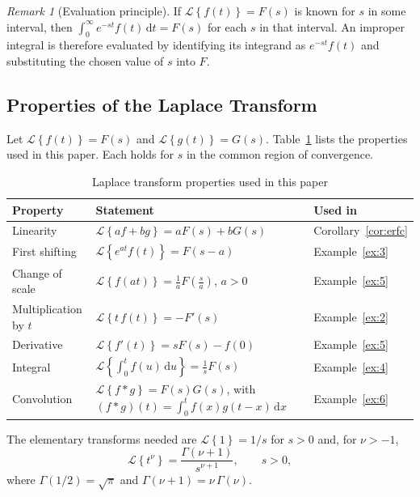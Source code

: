 \documentclass[12pt,a4paper]{article}
\theoremstyle{definition}
\theoremstyle{plain}
\theoremstyle{remark}
\newtheorem{remark}{Remark}[section]
\newcommand{\Lap}[1]{\mathcal{L}\!\left\{#1\right\}}
\newcommand{\dd}{\,\mathrm{d}}
\begin{document}
	\begin{remark}[Evaluation principle]\label{rem:principle}
		If $\Lap{f(t)}=F(s)$ is known for $s$ in some interval, then $\int_0^\infty e^{-st}f(t)\dd t=F(s)$ for each $s$ in that interval. An improper integral is therefore evaluated by identifying its integrand as $e^{-st}f(t)$ and substituting the chosen value of $s$ into $F$.
	\end{remark}
	
	\subsection{Properties of the Laplace Transform}
	
	Let $\Lap{f(t)}=F(s)$ and $\Lap{g(t)}=G(s)$. Table~\ref{tab:properties} lists the properties used in this paper. Each holds for $s$ in the common region of convergence.
	
	\begin{table}[htbp]
		\centering
		\caption{Laplace transform properties used in this paper}
		\label{tab:properties}
		\renewcommand{\arraystretch}{1.4}
		\begin{tabular}{l p{7.6cm} l}
			\toprule
			Property & Statement & Used in \\
			\midrule
			Linearity & $\Lap{af+bg}=aF(s)+bG(s)$ & Corollary~\ref{cor:erfc} \\
			First shifting & $\Lap{e^{at}f(t)}=F(s-a)$ & Example~\ref{ex:3} \\
			Change of scale & $\Lap{f(at)}=\tfrac{1}{a}F\!\left(\tfrac{s}{a}\right)$, $a>0$ & Example~\ref{ex:5} \\
			Multiplication by $t$ & $\Lap{t\,f(t)}=-F'(s)$ & Example~\ref{ex:2} \\
			Derivative & $\Lap{f'(t)}=sF(s)-f(0)$ & Example~\ref{ex:5} \\
			Integral & $\Lap{\int_0^t f(u)\dd u}=\tfrac{1}{s}F(s)$ & Example~\ref{ex:4} \\
			Convolution & $\Lap{f*g}=F(s)G(s)$, with $(f*g)(t)=\int_0^t f(x)g(t-x)\dd x$ & Example~\ref{ex:6} \\
			\bottomrule
		\end{tabular}
	\end{table}
	
	The elementary transforms needed are $\Lap{1}=1/s$ for $s>0$ and, for $\nu>-1$,
	\begin{equation}\label{eq:power}
		\Lap{t^{\nu}}=\frac{\Gamma(\nu+1)}{s^{\nu+1}},\qquad s>0,
	\end{equation}
	where $\Gamma(1/2)=\sqrt{\pi}$ and $\Gamma(\nu+1)=\nu\,\Gamma(\nu)$.
	
\end{document}
